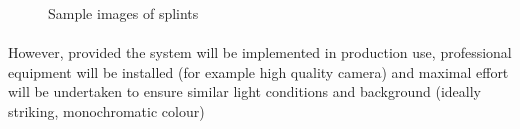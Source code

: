 \begin{figure}[H]
     \centering
     \qquad
     \qquad
     \vfill
     \qquad
     \caption{Sample images of splints}
     \label{fig:different_lightning_conditions}
\end{figure}
 
\paragraph{}
However, provided the system will be implemented in production use, professional equipment will be installed (for example high quality camera) and maximal effort will be undertaken to ensure similar light conditions and background (ideally striking, monochromatic colour)

